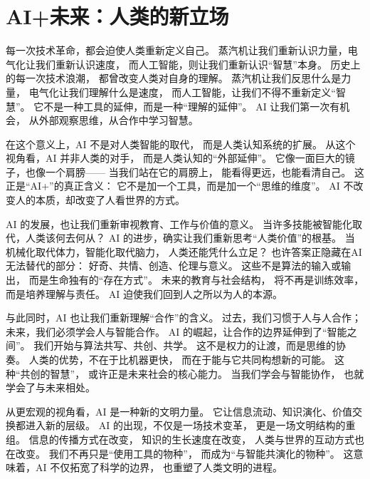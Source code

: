 \section{AI+未来：人类的新立场}

每一次技术革命，都会迫使人类重新定义自己。  
蒸汽机让我们重新认识力量，电气化让我们重新认识速度，  
而人工智能，则让我们重新认识“智慧”本身。  
历史上的每一次技术浪潮，  
都曾改变人类对自身的理解。  
蒸汽机让我们反思什么是力量，  
电气化让我们理解什么是速度，  
而人工智能，让我们不得不重新定义“智慧”。  
它不是一种工具的延伸，而是一种“理解的延伸”。  
AI 让我们第一次有机会，  
从外部观察思维，从合作中学习智慧。

在这个意义上，AI 不是对人类智能的取代，  
而是人类认知系统的扩展。  
从这个视角看，AI 并非人类的对手，  
而是人类认知的“外部延伸”。  
它像一面巨大的镜子，也像一个肩膀——  
当我们站在它的肩膀上，  
能看得更远，也能看清自己。  
这正是“AI+”的真正含义：  
它不是加一个工具，而是加一个“思维的维度”。  
AI 不改变人的本质，却改变了人看世界的方式。

AI 的发展，也让我们重新审视教育、工作与价值的意义。  
当许多技能被智能化取代，人类该何去何从？  
AI 的进步，确实让我们重新思考“人类价值”的根基。  
当机械化取代体力，智能化取代脑力，  
人类还能凭什么立足？  
也许答案正隐藏在AI无法替代的部分：  
好奇、共情、创造、伦理与意义。  
这些不是算法的输入或输出，  
而是生命独有的“存在方式”。  
未来的教育与社会结构，  
将不再是训练效率，而是培养理解与责任。  
AI 迫使我们回到人之所以为人的本源。

与此同时，AI 也让我们重新理解“合作”的含义。  
过去，我们习惯于人与人合作；  
未来，我们必须学会人与智能合作。  
AI 的崛起，让合作的边界延伸到了“智能之间”。  
我们开始与算法共写、共创、共学。  
这不是权力的让渡，而是思维的协奏。  
人类的优势，不在于比机器更快，  
而在于能与它共同构想新的可能。  
这种“共创的智慧”，  
或许正是未来社会的核心能力。  
当我们学会与智能协作，  
也就学会了与未来相处。

从更宏观的视角看，AI 是一种新的文明力量。  
它让信息流动、知识演化、价值交换都进入新的层级。  
AI 的出现，不仅是一场技术变革，  
更是一场文明结构的重组。  
信息的传播方式在改变，  
知识的生长速度在改变，  
人类与世界的互动方式也在改变。  
我们不再只是“使用工具的物种”，  
而成为“与智能共演化的物种”。  
这意味着，AI 不仅拓宽了科学的边界，  
也重塑了人类文明的进程。

